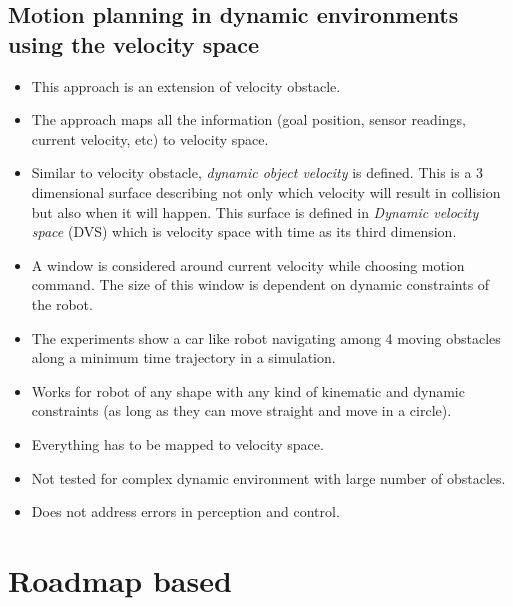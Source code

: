 \documentclass[11pt]{article}
\begin{document}
\subsection{Motion planning in dynamic environments using the velocity space\cite{owen2005motion}}
\begin{itemize}
    \item This approach is an extension of velocity obstacle\cite{fiorini1998motion}.
    \item The approach maps all the information (goal position, sensor readings, current velocity, etc) to velocity space.
    \item Similar to velocity obstacle, \textit{dynamic object velocity} is defined. This is a 3 dimensional surface describing not only which velocity will result in collision but also when it will happen. This surface is defined in \textit{Dynamic velocity space} (DVS) which is velocity space with time as its third dimension.
    \item A window is considered around current velocity while choosing motion command. The size of this window is dependent on dynamic constraints of the robot.
    \item The experiments show a car like robot navigating among 4 moving obstacles along a minimum time trajectory in a simulation.
        \color{green}
    \item Works for robot of any shape with any kind of kinematic and dynamic constraints (as long as they can move straight and move in a circle).
        \color{red}
    \item Everything has to be mapped to velocity space.
    \item Not tested for complex dynamic environment with large number of obstacles.
    \item Does not address errors in perception and control.
\end{itemize}

\section{Roadmap based}
\end{document}
